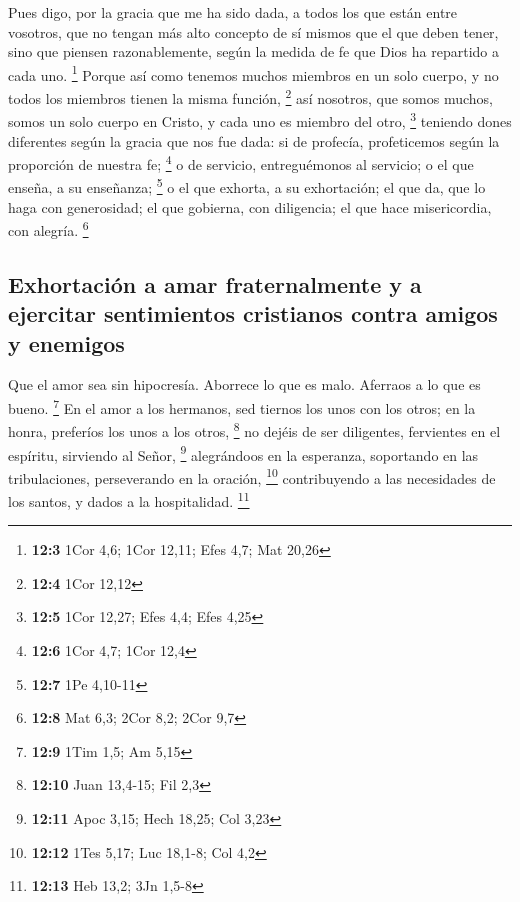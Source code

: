 \begin{paracol}{2}
 Pues digo, por la gracia que me ha sido dada, a todos los
que están entre vosotros, que no tengan más alto concepto de sí mismos
que el que deben tener, sino que piensen razonablemente, según la medida
de fe que Dios ha repartido a cada uno. \footnote{\textbf{12:3} 1Cor
  4,6; 1Cor 12,11; Efes 4,7; Mat 20,26}  Porque así como
tenemos muchos miembros en un solo cuerpo, y no todos los miembros
tienen la misma función, \footnote{\textbf{12:4} 1Cor 12,12}
 así nosotros, que somos muchos, somos un solo cuerpo en
Cristo, y cada uno es miembro del otro, \footnote{\textbf{12:5} 1Cor
  12,27; Efes 4,4; Efes 4,25}  teniendo dones diferentes
según la gracia que nos fue dada: si de profecía, profeticemos según la
proporción de nuestra fe; \footnote{\textbf{12:6} 1Cor 4,7; 1Cor 12,4}
 o de servicio, entreguémonos al servicio; o el que
enseña, a su enseñanza; \footnote{\textbf{12:7} 1Pe 4,10-11}
 o el que exhorta, a su exhortación; el que da, que lo
haga con generosidad; el que gobierna, con diligencia; el que hace
misericordia, con alegría. \footnote{\textbf{12:8} Mat 6,3; 2Cor 8,2;
  2Cor 9,7}

\hypertarget{exhortaciuxf3n-a-amar-fraternalmente-y-a-ejercitar-sentimientos-cristianos-contra-amigos-y-enemigos}{%
\subsection{Exhortación a amar fraternalmente y a ejercitar sentimientos
cristianos contra amigos y
enemigos}\label{exhortaciuxf3n-a-amar-fraternalmente-y-a-ejercitar-sentimientos-cristianos-contra-amigos-y-enemigos}}

 Que el amor sea sin hipocresía. Aborrece lo que es malo.
Aferraos a lo que es bueno. \footnote{\textbf{12:9} 1Tim 1,5; Am 5,15}
 En el amor a los hermanos, sed tiernos los unos con los
otros; en la honra, preferíos los unos a los otros, \footnote{\textbf{12:10}
  Juan 13,4-15; Fil 2,3}  no dejéis de ser diligentes,
fervientes en el espíritu, sirviendo al Señor, \footnote{\textbf{12:11}
  Apoc 3,15; Hech 18,25; Col 3,23}  alegrándoos en la
esperanza, soportando en las tribulaciones, perseverando en la oración,
\footnote{\textbf{12:12} 1Tes 5,17; Luc 18,1-8; Col 4,2} 
contribuyendo a las necesidades de los santos, y dados a la
hospitalidad. \footnote{\textbf{12:13} Heb 13,2; 3Jn 1,5-8}


\end{paracol}
